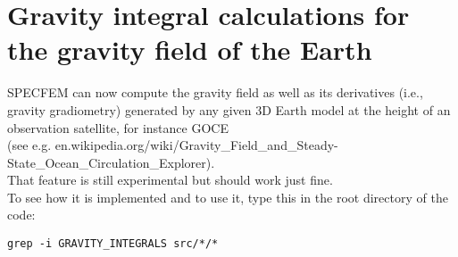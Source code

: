 \chapter{Gravity integral calculations for the gravity field of the Earth}


SPECFEM can now compute the gravity field as well as its derivatives (i.e., gravity gradiometry)
generated by any given 3D Earth model at the height
of an observation satellite, for instance GOCE\\
(see e.g. en.wikipedia.org/wiki/Gravity\_Field\_and\_Steady-State\_Ocean\_Circulation\_Explorer).\\
That feature is still experimental but should work just fine.\\

\noindent
To see how it is implemented and to use it, type this in the root directory of the code:
\begin{verbatim}
grep -i GRAVITY_INTEGRALS src/*/*
\end{verbatim}

